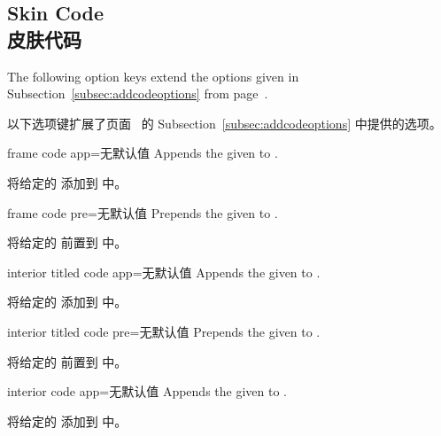 
\subsection{Skin Code\\皮肤代码}
The following option keys extend the options given in Subsection~\ref{subsec:addcodeoptions}
from page~\pageref{subsec:addcodeoptions}.

以下选项键扩展了页面~\pageref{subsec:addcodeoptions} 的 Subsection~\ref{subsec:addcodeoptions} 中提供的选项。
\begin{docTcbKey}{frame code app}{=}{无默认值}
Appends the given  to .

将给定的  添加到  中。
\end{docTcbKey}

\begin{docTcbKey}{frame code pre}{=}{无默认值}
Prepends the given  to .

将给定的  前置到  中。
\end{docTcbKey}

\begin{docTcbKey}{interior titled code app}{=}{无默认值}
Appends the given  to .

将给定的  添加到  中。
\begin{dispExample}
\begin{tcolorbox}[title=My title,enhanced,colframe=Navy,
frame code app={\draw[yellow,line width=1cm] (
frame.south west)--(frame.north east);},
interior titled code app={\draw[red,line width=1cm]
(frame.north west)--(frame.south east);},
]
\lipsum[1]
\end{tcolorbox}
\end{dispExample}
\end{docTcbKey}

\begin{docTcbKey}{interior titled code pre}{=}{无默认值}
Prepends the given  to .

将给定的  前置到  中。
\end{docTcbKey}

\begin{docTcbKey}{interior code app}{=}{无默认值}
Appends the given  to .

将给定的  添加到  中。
\end{docTcbKey}

